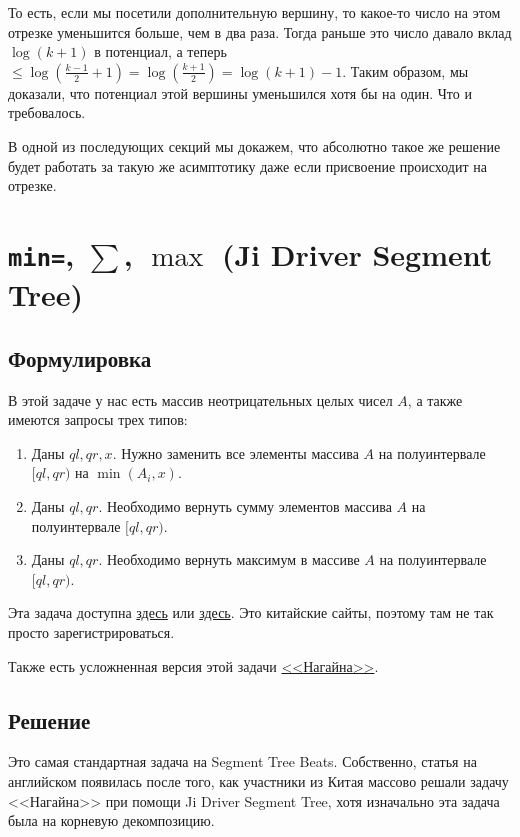 То есть, если мы посетили дополнительную вершину, то какое-то число на этом отрезке уменьшится больше, чем в два раза. Тогда раньше это число давало вклад $\log (k + 1)$ в потенциал, а теперь $\le \log ( \frac{k - 1}{2} + 1) = \log (\frac{k + 1}{2}) = \log (k + 1) - 1$. Таким образом, мы доказали, что потенциал этой вершины уменьшился хотя бы на один. Что и требовалось.

\begin{observation}
    В одной из последующих секций мы докажем, что абсолютно такое же решение будет работать за такую же асимптотику даже если присвоение происходит на отрезке.
\end{observation}

\cprotect \section{\verb+min=+, $\sum$, $\max$ (Ji Driver Segment Tree)}

\subsection{Формулировка}

В этой задаче у нас есть массив неотрицательных целых чисел $A$, а также имеются запросы трех типов:

\begin{enumerate}
    \item Даны $ql, qr, x$. Нужно заменить все элементы массива $A$ на полуинтервале $[ql, qr)$ на $\min(A_i, x)$.
    \item Даны $ql, qr$. Необходимо вернуть сумму элементов массива $A$ на полуинтервале $[ql, qr)$.
    \item Даны $ql, qr$. Необходимо вернуть максимум в массиве $A$ на полуинтервале $[ql, qr)$.
\end{enumerate}

Эта задача доступна \href{https://vjudge.net/problem/HDU-5306}{здесь} или \href{http://acm.hdu.edu.cn/showproblem.php?pid=5306}{здесь}. Это китайские сайты, поэтому там не так просто зарегистрироваться.

Также есть усложненная версия этой задачи \href{https://codeforces.com/problemset/problem/855/F}{<<Нагайна>>}.

\subsection{Решение}

Это самая стандартная задача на Segment Tree Beats. Собственно, статья на английском появилась после того, как участники из Китая массово решали задачу <<Нагайна>> при помощи Ji Driver Segment Tree, хотя изначально эта задача была на корневую декомпозицию.

